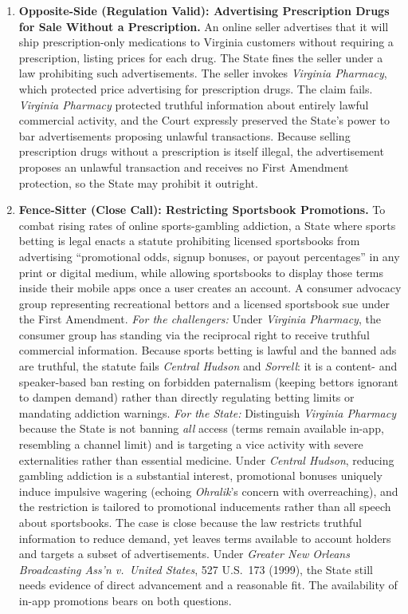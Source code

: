 \documentclass[12pt]{article}
\begin{document}
\begin{enumerate}
\item \textbf{Opposite-Side (Regulation Valid): Advertising Prescription Drugs for Sale Without a Prescription.} An online seller advertises that it will ship prescription-only medications to Virginia customers without requiring a prescription, listing prices for each drug. The State fines the seller under a law prohibiting such advertisements. The seller invokes \textit{Virginia Pharmacy}, which protected price advertising for prescription drugs. The claim fails. \textit{Virginia Pharmacy} protected truthful information about entirely lawful commercial activity, and the Court expressly preserved the State's power to bar advertisements proposing unlawful transactions. Because selling prescription drugs without a prescription is itself illegal, the advertisement proposes an unlawful transaction and receives no First Amendment protection, so the State may prohibit it outright.

\item \textbf{Fence-Sitter (Close Call): Restricting Sportsbook Promotions.} To combat rising rates of online sports-gambling addiction, a State where sports betting is legal enacts a statute prohibiting licensed sportsbooks from advertising ``promotional odds, signup bonuses, or payout percentages'' in any print or digital medium, while allowing sportsbooks to display those terms inside their mobile apps once a user creates an account. A consumer advocacy group representing recreational bettors and a licensed sportsbook sue under the First Amendment. \textit{For the challengers:} Under \textit{Virginia Pharmacy}, the consumer group has standing via the reciprocal right to receive truthful commercial information. Because sports betting is lawful and the banned ads are truthful, the statute fails \textit{Central Hudson} and \textit{Sorrell}: it is a content- and speaker-based ban resting on forbidden paternalism (keeping bettors ignorant to dampen demand) rather than directly regulating betting limits or mandating addiction warnings. \textit{For the State:} Distinguish \textit{Virginia Pharmacy} because the State is not banning \textit{all} access (terms remain available in-app, resembling a channel limit) and is targeting a vice activity with severe externalities rather than essential medicine. Under \textit{Central Hudson}, reducing gambling addiction is a substantial interest, promotional bonuses uniquely induce impulsive wagering (echoing \textit{Ohralik}'s concern with overreaching), and the restriction is tailored to promotional inducements rather than all speech about sportsbooks. The case is close because the law restricts truthful information to reduce demand, yet leaves terms available to account holders and targets a subset of advertisements. Under \textit{Greater New Orleans Broadcasting Ass'n v.\ United States}, 527 U.S.\ 173 (1999), the State still needs evidence of direct advancement and a reasonable fit. The availability of in-app promotions bears on both questions.

\end{enumerate}
\end{document}
